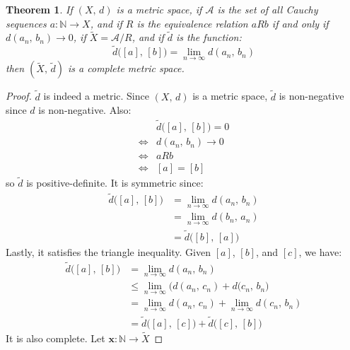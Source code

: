 \documentclass{article}
\theoremstyle{plain}
\newtheorem{theorem}{Theorem}
\theoremstyle{normal}
\begin{document}
    \begin{theorem}
        If $(X,\,d)$ is a metric space, if $\mathcal{A}$ is the set of all
        Cauchy sequences $a:\mathbb{N}\rightarrow{X}$, and if
        $R$ is the equivalence relation $aRb$ if and only if
        $d(a_{n},\,b_{n})\rightarrow{0}$, if $\tilde{X}=\mathcal{A}/R$, and
        if $\tilde{d}$ is the function:
        \begin{equation}
            \tilde{d}\big([a],\,[b]\big)=\lim_{n\rightarrow\infty}
                d(a_{n},\,b_{n})
        \end{equation}
        then $(\tilde{X},\,\tilde{d})$ is a complete metric space.
    \end{theorem}
    \begin{proof}
        $\tilde{d}$ is indeed a metric. Since $(X,\,d)$ is a metric space,
        $\tilde{d}$ is non-negative since $d$ is non-negative. Also:
        \begin{align}
            &\tilde{d}\big([a],\,[b]\big)=0\\
            \Leftrightarrow&{d}(a_{n},\,b_{n})\rightarrow{0}\\
            \Leftrightarrow&{a}Rb\\
            \Leftrightarrow&[a]=[b]
        \end{align}
        so $\tilde{d}$ is positive-definite. It is symmetric since:
        \begin{align}
            \tilde{d}\big([a],\,[b]\big)
            &=\lim_{n\rightarrow\infty}d(a_{n},\,b_{n})\\
            &=\lim_{n\rightarrow\infty}d(b_{n},\,a_{n})\\
            &=\tilde{d}\big([b],\,[a]\big)
        \end{align}
        Lastly, it satisfies the triangle inequality. Given $[a]$, $[b]$, and
        $[c]$, we have:
        \begin{align}
            \tilde{d}\big([a],\,[b]\big)
            &=\lim_{n\rightarrow\infty}d(a_{n},\,b_{n})\\
            &\leq\lim_{n\rightarrow\infty}
                \big(d(a_{n},\,c_{n})+d(c_{n},\,b_{n}\big)\\
            &=\lim_{n\rightarrow\infty}d(a_{n},\,c_{n})+
                \lim_{n\rightarrow\infty}d(c_{n},\,b_{n})\\
            &=\tilde{d}\big([a],\,[c]\big)+\tilde{d}\big([c],\,[b]\big)
        \end{align}
        It is also complete. Let $\mathbf{x}:\mathbb{N}\rightarrow\tilde{X}$

\end{proof}
\end{document}

